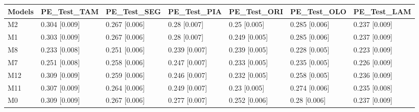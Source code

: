 \begin{table}[ht]
\centering
\begin{tabular}{lllllll}
  \hline
Models & PE\_Test\_TAM & PE\_Test\_SEG & PE\_Test\_PIA & PE\_Test\_ORI & PE\_Test\_OLO & PE\_Test\_LAM \\ 
  \hline
M2 & 0.304 [0.009] & 0.267 [0.006] & 0.28 [0.007] & 0.25 [0.005] & 0.285 [0.006] & 0.237 [0.009] \\ 
  M1 & 0.303 [0.009] & 0.267 [0.006] & 0.28 [0.007] & 0.249 [0.005] & 0.285 [0.006] & 0.237 [0.009] \\ 
  M8 & 0.233 [0.008] & 0.251 [0.006] & 0.239 [0.007] & 0.239 [0.005] & 0.228 [0.005] & 0.223 [0.009] \\ 
  M7 & 0.251 [0.008] & 0.258 [0.006] & 0.247 [0.007] & 0.233 [0.005] & 0.235 [0.005] & 0.226 [0.009] \\ 
  M12 & 0.309 [0.009] & 0.259 [0.006] & 0.246 [0.007] & 0.232 [0.005] & 0.258 [0.005] & 0.236 [0.009] \\ 
  M11 & 0.307 [0.009] & 0.264 [0.006] & 0.249 [0.007] & 0.23 [0.005] & 0.274 [0.006] & 0.235 [0.008] \\ 
  M0 & 0.309 [0.009] & 0.267 [0.006] & 0.277 [0.007] & 0.252 [0.006] & 0.28 [0.006] & 0.237 [0.009] \\ 
   \hline
\end{tabular}
\end{table}
